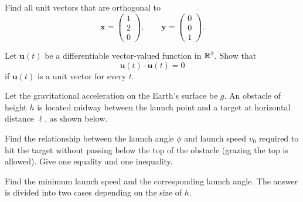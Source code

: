 \begin{problem}
\begin{problemsubparts}
\item Find all unit vectors that are orthogonal to
\[
\mathbf x=
\begin{pmatrix}1\\2\\0\end{pmatrix},
\qquad
\mathbf y=
\begin{pmatrix}0\\0\\1\end{pmatrix}.
\]
\item Let $\mathbf u(t)$ be a differentiable vector-valued function in $\mathbb{R}^3$. Show that
\[
\mathbf u(t)\cdot\dot{\mathbf u}(t)=0
\]
if $\mathbf u(t)$ is a unit vector for every $t$.
\end{problemsubparts}
\end{problem}

\begin{problem}
Let the gravitational acceleration on the Earth's surface be $g$. An obstacle of height $h$ is located midway between the launch point and a target at horizontal distance $\ell$, as shown below.

\begin{center}
\end{center}

\begin{problemsubparts}
\item Find the relationship between the launch angle $\phi$ and launch speed $v_0$ required to hit the target without passing below the top of the obstacle (grazing the top is allowed). Give one equality and one inequality.
\item Find the minimum launch speed and the corresponding launch angle. The answer is divided into two cases depending on the size of $h$.
\end{problemsubparts}
\end{problem}

